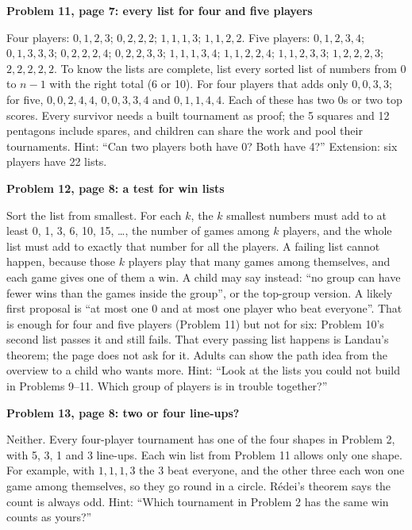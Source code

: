 \documentclass[11pt]{article}
\newcommand{\sub}[1]{\par\needspace{3\baselineskip}\textbf{#1}\par}
\begin{document}
\sub{Problem 11, page 7: every list for four and five players}
Four players: $0,1,2,3$; $0,2,2,2$; $1,1,1,3$; $1,1,2,2$. Five players: $0,1,2,3,4$; $0,1,3,3,3$; $0,2,2,2,4$; $0,2,2,3,3$; $1,1,1,3,4$; $1,1,2,2,4$; $1,1,2,3,3$; $1,2,2,2,3$; $2,2,2,2,2$. To know the lists are complete, list every sorted list of numbers from 0 to $n-1$ with the right total (6 or 10). For four players that adds only $0,0,3,3$; for five, $0,0,2,4,4$, $0,0,3,3,4$ and $0,1,1,4,4$. Each of these has two 0s or two top scores. Every survivor needs a built tournament as proof; the 5 squares and 12 pentagons include spares, and children can share the work and pool their tournaments. Hint: ``Can two players both have 0? Both have 4?'' Extension: six players have 22 lists.

\sub{Problem 12, page 8: a test for win lists}
Sort the list from smallest. For each $k$, the $k$ smallest numbers must add to at least 0, 1, 3, 6, 10, 15, \dots, the number of games among $k$ players, and the whole list must add to exactly that number for all the players. A failing list cannot happen, because those $k$ players play that many games among themselves, and each game gives one of them a win. A child may say instead: ``no group can have fewer wins than the games inside the group'', or the top-group version. A likely first proposal is ``at most one 0 and at most one player who beat everyone''. That is enough for four and five players (Problem 11) but not for six: Problem 10's second list passes it and still fails. That every passing list happens is Landau's theorem; the page does not ask for it. Adults can show the path idea from the overview to a child who wants more. Hint: ``Look at the lists you could not build in Problems 9--11. Which group of players is in trouble together?''

\sub{Problem 13, page 8: two or four line-ups?}
Neither. Every four-player tournament has one of the four shapes in Problem 2, with 5, 3, 1 and 3 line-ups. Each win list from Problem 11 allows only one shape. For example, with $1,1,1,3$ the 3 beat everyone, and the other three each won one game among themselves, so they go round in a circle. R\'edei's theorem says the count is always odd. Hint: ``Which tournament in Problem 2 has the same win counts as yours?''
\end{document}
